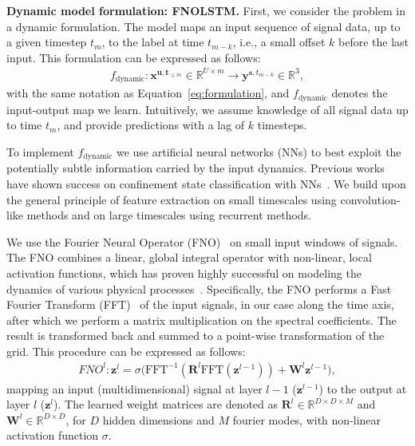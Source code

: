 \textbf{Dynamic model formulation: FNOLSTM.}
First, we consider the problem in a dynamic formulation. The model maps an input sequence of signal data, up to a given timestep $t_m$, to the label at time $t_{m-k}$, i.e., a small offset $k$ before the last input. This formulation can be expressed as follows:
\begin{align}
f_{\text{dynamic}}: \mathbf{x}^{\mathbf{u},\mathbf{t}_{\leq m}} \in \mathbb{R}^{\textit{U} \times m}\rightarrow \mathbf{y}^{\mathbf{s},t_{m-k}}\in \mathbb{R}^{3},
\label{eq:fdynamic}
\end{align}
with the same notation as Equation~\ref{eq:formulation}, and $f_{\text{dynamic}}$ denotes the input-output map we learn. Intuitively, we assume knowledge of all signal data up to time $t_m$, and provide predictions with a lag of $k$ timesteps.

To implement $f_{\text{dynamic}}$ we use artificial neural networks (NNs) to best exploit the potentially subtle information carried by the input dynamics. Previous works have shown success on confinement state classification with NNs~\cite{mathews2019,zorek2022,orozco2022,gill2024,yang2024,he2024,shin2020,meakins2010,matoslhd2020,matoslhd2021}. We build upon the general principle of feature extraction on small timescales using convolution-like methods and on large timescales using recurrent methods.

We use the Fourier Neural Operator (FNO)~\cite{li2021} on small input windows of signals. The FNO combines a linear, global integral operator with non-linear, local activation functions, which has proven highly successful on modeling the dynamics of various physical processes~\cite{wen2022,thorsten2023,Poels2023neuralPDE,Gopakumar2024PlasmaSurrogate}. Specifically, the FNO performs a Fast Fourier Transform (FFT)~\cite{cooley1965} of the input signals, in our case along the time axis, after which we perform a matrix multiplication on the spectral coefficients. The result is transformed back and summed to a point-wise transformation of the grid. This procedure can be expressed as follows:
\begin{align}
    \textit{FNO}^l: \mathbf{z}^l = \sigma\big(\text{FFT}^{-1}(\mathbf{R}^l\text{FFT}(\mathbf{z}^{l-1})) + \mathbf{W}^l \mathbf{z}^{l-1}\big),
    \label{eq:fno}
\end{align}
mapping an input (multidimensional) signal at layer $l-1$ ($\mathbf{z}^{l-1}$) to the output at layer $l$ ($\mathbf{z}^{l}$). The learned weight matrices are denoted as $\mathbf{R}^l \in \mathbb{R}^{D \times D \times M}$ and $\mathbf{W}^l \in \mathbb{R}^{D \times D}$, for $D$ hidden dimensions and $M$ fourier modes, with non-linear activation function $\sigma$.

